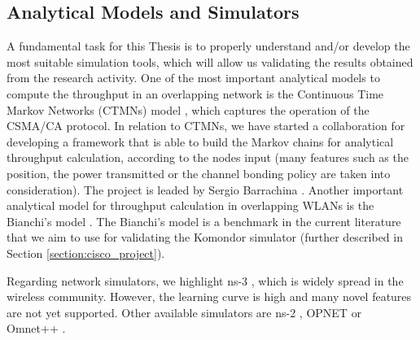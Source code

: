 \documentclass[12pt, a4paper,twoside]{tesi_upf}
\begin{document}
			\subsection{Analytical Models and Simulators}
			\label{section:validation}	
				A fundamental task for this Thesis is to properly understand and/or develop the most suitable simulation tools, which will allow us validating the results obtained from the research activity. One of the most important analytical models to compute the throughput in an overlapping network is the Continuous Time Markov Networks (CTMNs) model \cite{bellalta2014throughput}, which captures the operation of the CSMA/CA protocol. In relation to CTMNs, we have started a collaboration for developing a framework that is able to build the Markov chains for analytical throughput calculation, according to the nodes input (many features such as the position, the power transmitted or the channel bonding policy are taken into consideration). The project is leaded by Sergio Barrachina \cite{barrachina2017ctmn}. Another important analytical model for throughput calculation in overlapping WLANs is the Bianchi's model \cite{bianchi2000performance}. The Bianchi's model is a benchmark in the current literature that we aim to use for validating the Komondor simulator (further described in Section \ref{section:cisco_project}).				
				
				Regarding network simulators, we highlight ns-3 \cite{carneiro2010ns}, which is widely spread in the wireless community. However, the learning curve is high and many novel features are not yet supported. 	Other available simulators are ns-2 \cite{issariyakul2011introduction}, OPNET \cite{modeler2009opnet} or Omnet++ \cite{varga2008overview}.
				
\end{document}
